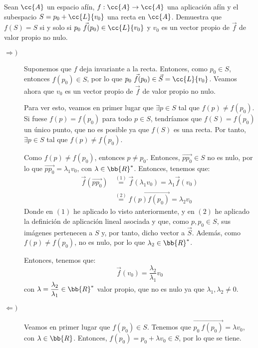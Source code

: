 \begin{ejercicio}
    Sean $\cc{A}$ un espacio afín, $f : \cc{A} \to \cc{A}$ una aplicación afín y el subespacio $S = p_0 + \cc{L}\{v_0\}$ una recta en $\cc{A}$. Demuestra que $f(S) = S$ si y solo si $\vec{p_0~f(p_0)} \in \cc{L}\{v_0\}$ y $v_0$ es un vector propio de $\vec{f}$ de valor propio no nulo.
    \begin{description}
        \item[$\Longrightarrow)$] Suponemos que $f$ deja invariante a la recta. Entonces, como $p_0\in S$, entonces $f(p_0)\in S$, por lo que $\vec{p_0~f(p_0)}\in \vec{S}=\cc{L}\{v_0\}$. Veamos ahora que $v_0$ es un vector propio de $\vec{f}$ de valor propio no nulo.

        Para ver esto, veamos en primer lugar que $\exists p\in S$ tal que $f(p)\neq f(p_0)$. Si fuese $f(p)=f(p_0)$ para todo $p\in S$, tendríamos que $f(S)=f(p_0)$ un único punto, que no es posible ya que $f(S)$ es una recta. Por tanto, $\exists p\in S$ tal que $f(p)\neq f(p_0)$.

        Como $f(p)\neq f(p_0)$, entonces $p\neq p_0$. Entonces, $\vec{pp_0}\in S$ no es nulo, por lo que $\vec{pp_0}=\lambda_1 v_0$, con $\lambda\in \bb{R}^\ast$. Entonces, tenemos que:
        \begin{equation*}
            \begin{split}
                \vec{f}(\vec{pp_0}) &\stackrel{(1)}{=} \vec{f}(\lambda_1 v_0) = \lambda_1 \vec{f}(v_0) \\
                    &\stackrel{(2)}{=} \vec{f(p)f(p_0)} = \lambda_2 v_0
            \end{split}
        \end{equation*}
        Donde en $(1)$ he aplicado lo visto anteriormente, y en $(2)$ he aplicado la definición de aplicación lineal asociada y que, como $p,p_0\in S$, sus imágenes pertenecen a $S$ y, por tanto, dicho vector a $\vec{S}$. Además, como $f(p)\neq f(p_0)$, no es nulo, por lo que $\lambda_2\in \bb{R}^\ast$.

        Entonces, tenemos que:
        \begin{equation*}
            \vec{f}(v_0) = \frac{\lambda_2}{\lambda_1} v_0
        \end{equation*}
        con $\lambda = \dfrac{\lambda_2}{\lambda_1}\in \bb{R}^\ast$ valor propio, que no es nulo ya que $\lambda_1,\lambda_2\neq 0$.

        \item[$\Longleftarrow)$] Veamos en primer lugar que $f(p_0)\in S$. Tenemos que $\vec{p_0~f(p_0)}=\lambda v_0$, con $\lambda\in \bb{R}$. Entonces, $f(p_0)=p_0+\lambda v_0\in S$, por lo que se tiene.


\end{description}
\end{ejercicio}
